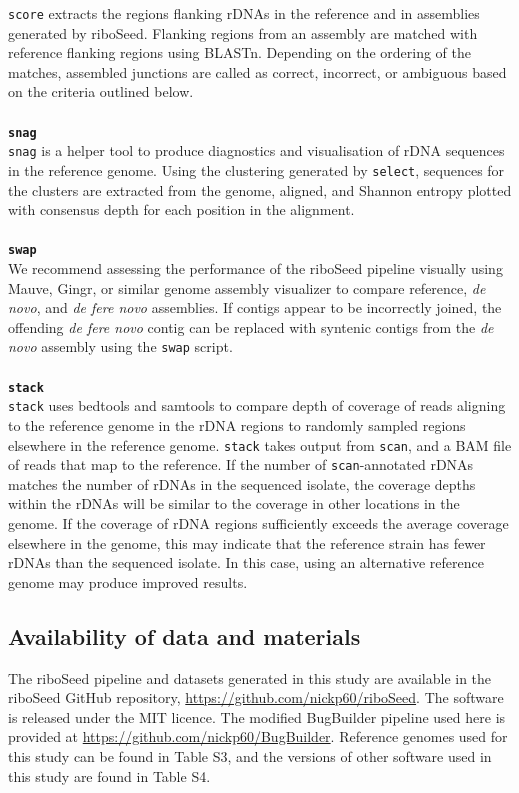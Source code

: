 \documentclass[a4,center,fleqn]{NAR}
\begin{document}
\texttt{score} extracts the regions flanking rDNAs in the reference and in assemblies generated by riboSeed. Flanking regions from an assembly are matched with reference flanking regions using BLASTn. Depending on the ordering of the matches, assembled junctions are called as correct, incorrect, or ambiguous based on the criteria outlined below.\\
\\
\textbf{\texttt{snag}}\\
\texttt{snag} is a helper tool to produce diagnostics and visualisation of rDNA sequences in the reference genome. Using the clustering generated by \texttt{select}, sequences for the clusters are extracted from the genome, aligned, and Shannon entropy \cite{Schmitt1997} plotted with consensus depth for each position in the alignment.\\
\\
\textbf{\texttt{swap}}\\
We recommend assessing the performance of the riboSeed pipeline visually using Mauve\cite{Darling2004,Darling2011}, Gingr\cite{Treangen2014}, or similar genome assembly visualizer to compare reference, \textit{de novo}, and \textit{de fere novo} assemblies. If contigs appear to be incorrectly joined, the offending \textit{de fere novo} contig can be replaced with syntenic contigs from the \textit{de novo} assembly using the \texttt{swap} script.\\
\\
\textbf{\texttt{stack}}\\
\texttt{stack} uses bedtools\cite{Quinlan2010} and samtools\cite{Li2009} to compare depth of coverage of reads aligning to the reference genome in the rDNA regions to randomly sampled regions elsewhere in the reference genome. \texttt{stack} takes output from \texttt{scan}, and a BAM file of reads that map to the reference. If the number of \texttt{scan}-annotated rDNAs matches the number of rDNAs in the sequenced isolate, the coverage depths within the rDNAs will be similar to the coverage in other locations in the genome. If the coverage of rDNA regions sufficiently exceeds the average coverage elsewhere in the genome, this may indicate that the reference strain has fewer rDNAs than the sequenced isolate. In this case, using an alternative reference genome may produce improved results.

\subsection*{Availability of data and materials}
The riboSeed pipeline and datasets generated in this study are available in the riboSeed GitHub repository, \url{https://github.com/nickp60/riboSeed}. The software is released under the MIT licence.  The modified BugBuilder pipeline used here is provided at \url{https://github.com/nickp60/BugBuilder}. Reference genomes used for this study can be found in Table S3, and the versions of other software used in this study are found in Table S4.
\end{document}
